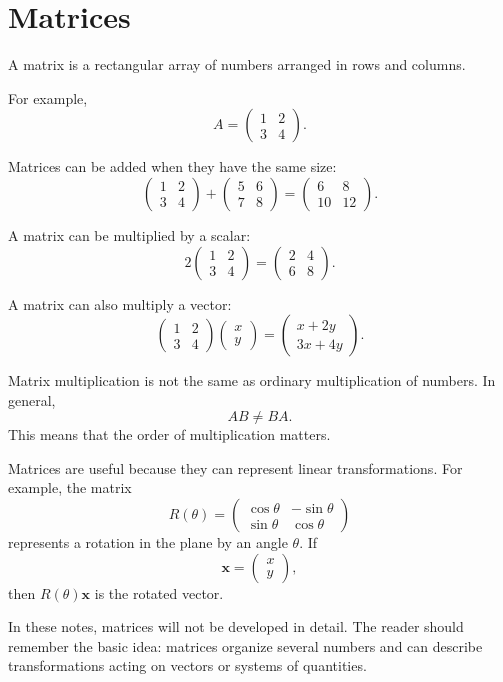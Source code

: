 \section{Matrices}

\begin{definitionbox}
A matrix is a rectangular array of numbers arranged in rows and columns.
\end{definitionbox}

For example,
\[
A=
\begin{pmatrix}
1 & 2 \\
3 & 4
\end{pmatrix}.
\]

Matrices can be added when they have the same size:
\[
\begin{pmatrix}
1 & 2 \\
3 & 4
\end{pmatrix}
+
\begin{pmatrix}
5 & 6 \\
7 & 8
\end{pmatrix}
=
\begin{pmatrix}
6 & 8 \\
10 & 12
\end{pmatrix}.
\]

A matrix can be multiplied by a scalar:
\[
2
\begin{pmatrix}
1 & 2 \\
3 & 4
\end{pmatrix}
=
\begin{pmatrix}
2 & 4 \\
6 & 8
\end{pmatrix}.
\]

A matrix can also multiply a vector:
\[
\begin{pmatrix}
1 & 2 \\
3 & 4
\end{pmatrix}
\begin{pmatrix}
x \\
y
\end{pmatrix}
=
\begin{pmatrix}
x+2y \\
3x+4y
\end{pmatrix}.
\]

Matrix multiplication is not the same as ordinary multiplication of numbers. In general,
\[
AB \neq BA.
\]
This means that the order of multiplication matters.

Matrices are useful because they can represent linear transformations. For example, the matrix
\[
R(\theta)=
\begin{pmatrix}
\cos\theta & -\sin\theta \\
\sin\theta & \cos\theta
\end{pmatrix}
\]
represents a rotation in the plane by an angle \(\theta\). If
\[
\mathbf{x}=\begin{pmatrix}x\\y\end{pmatrix},
\]
then \(R(\theta)\mathbf{x}\) is the rotated vector.

\begin{remarkbox}
In these notes, matrices will not be developed in detail. The reader should remember the basic idea: matrices organize several numbers and can describe transformations acting on vectors or systems of quantities.
\end{remarkbox}
